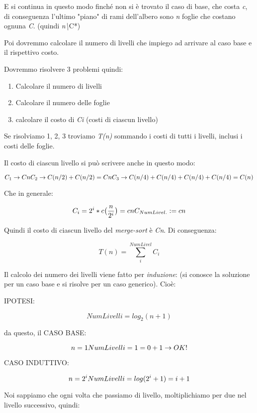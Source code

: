 \documentclass[
]{article}
\begin{document}
E si continua in questo modo finché non si è trovato il caso di base,
che costa \emph{c}, di conseguenza l'ultimo "piano" di rami dell'albero
sono \emph{n} foglie che costano ognuna \emph{C}. (quindi
\emph{n\textbackslash{}}C*)

Poi dovremmo calcolare il numero di livelli che impiego ad arrivare al
caso base e il rispettivo costo.

Dovremmo risolvere 3 problemi quindi:

\begin{enumerate}
\def\labelenumi{\arabic{enumi}.}
\item
  Calcolare il numero di livelli
\item
  Calcolare il numero delle foglie
\item
  calcolare il costo di \emph{Ci} (costi di ciascun livello)
\end{enumerate}

Se risolviamo 1, 2, 3 troviamo \emph{T(n)} sommando i costi di tutti i
livelli, inclusi i costi delle foglie.

Il costo di ciascun livello si può scrivere anche in questo modo:

\[C_1 \rightarrow Cn \\
C_2 \rightarrow C(n/2) + C(n/2) = Cn \\
C_3 \rightarrow C(n/4) + C(n/4) + C(n/4) + C(n/4) = C(n) \\\]

Che in generale:

\[C_i = 2^i * c\big({n \over 2^i}\big) = cn \\
C_{NumLivel.} := cn\]

Quindi il costo di ciascun livello del \emph{merge-sort} è \emph{Cn}. Di
conseguenza:

\[T(n) = \sum_{i}^{NumLivel} C_i\]

Il calcolo dei numero dei livelli viene fatto per \emph{induzione}: (si
conosce la soluzione per un caso base e si risolve per un caso
generico). Cioè:

IPOTESI:

\[NumLivelli = log_2(n+1)\]

da questo, il CASO BASE:

\[n = 1 \\
NumLivelli = 1 = 0+1 \rightarrow OK!\]

CASO INDUTTIVO:

\[n = 2^i \\
NumLivelli = log(2^i+1) = i+1\]

Noi sappiamo che ogni volta che passiamo di livello, moltiplichiamo per
due nel livello successivo, quindi:
\end{document}
